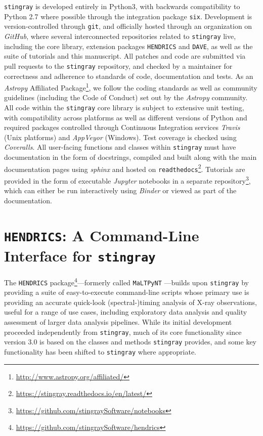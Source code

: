 \documentclass[twocolumn]{aastex62}
\newcommand{\stingray}{\texttt{stingray}\xspace}
\newcommand{\hendrics}{\texttt{HENDRICS}\xspace}
\begin{document}
\stingray is developed entirely in Python3, with backwards compatibility to Python 2.7 where possible through the integration package \texttt{six}. Development is version-controlled through \texttt{git}, and officially hosted through an organization on \textit{GitHub}, where several interconnected repositories related to \stingray live, including the core library, extension packages \hendrics and \texttt{DAVE}, as well as the suite of tutorials and this manuscript. All patches and code are submitted via pull requests to the \stingray repository, and checked by a maintainer for correctness and adherence to standards of code, documentation and tests. As an \textit{Astropy} Affiliated Package\footnote{\url{http://www.astropy.org/affiliated/}}, we follow the coding standards as well as community guidelines (including the Code of Conduct) set out by the \textit{Astropy} community. 
All code within the \stingray core library is subject to extensive unit testing, with compatibility across platforms as well as different versions of Python and required packages controlled through Continuous Integration services \textit{Travis} (Unix platforms) and \textit{AppVeyor} (Windows). Test coverage is checked using \textit{Coveralls}. 
All user-facing functions and classes within \stingray must have documentation in the form of docstrings, compiled and built along with the main documentation pages using \textit{sphinx} and hosted on \texttt{readthedocs}\footnote{\url{https://stingray.readthedocs.io/en/latest/}}. Tutorials are provided in the form of executable \textit{Jupyter} notebooks in a separate repository\footnote{\url{https://github.com/stingraySoftware/notebooks}}, which can either be run interactively using \textit{Binder} or viewed as part of the documentation. 


\section{\hendrics: A Command-Line Interface for \stingray}
\label{sec:hendrics}

The \hendrics package\footnote{\url{https://github.com/stingraySoftware/hendrics}}---formerly called \texttt{MaLTPyNT} \citep{bachetti2015b}---builds upon \stingray by providing a suite of easy-to-execute command-line scripts whose primary use is providing an accurate quick-look (spectral-)timing analysis of X-ray observations, useful for a range of use cases, including exploratory data analysis and quality assessment of larger data analysis pipelines. While its initial development proceeded independently from \stingray, much of its core functionality since version 3.0 is based on the classes and methods \stingray provides, and some key functionality has been shifted to \stingray where appropriate. 
\end{document}
